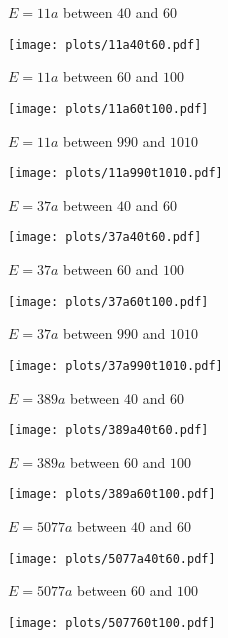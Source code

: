 \documentclass[11pt]{article}
\theoremstyle{plain}
\theoremstyle{definition}
\numberwithin{equation}{section}
\numberwithin{figure}{section}
\numberwithin{table}{section}
\begin{document}
 \centerline{ $E = 11a$  between $40$ and $60$}
   \vskip10pt
 \hskip100pt\texttt{[image: plots/11a40t60.pdf]}
    \newpage
  \centerline{ $E = 11a$  between $60$ and $100$}
   \vskip10pt
 \hskip100pt\texttt{[image: plots/11a60t100.pdf]}

   \vskip10pt
   \centerline{ $E = 11a$  between $990$ and $1010$}
   \vskip10pt
 \hskip100pt\texttt{[image: plots/11a990t1010.pdf]}

 \newpage
   \centerline{ $E = 37a$  between $40$ and $60$}

   \vskip10pt
 \hskip100pt\texttt{[image: plots/37a40t60.pdf]}

   \centerline{ $E = 37a$  between $60$ and $100$}
   \vskip10pt
 \hskip100pt\texttt{[image: plots/37a60t100.pdf]}
 \newpage
  \centerline{ $E = 37a$  between $990$ and $1010$}
   \vskip10pt
 \hskip100pt\texttt{[image: plots/37a990t1010.pdf]}
 \newpage
  \centerline{ $E = 389a$  between $40$ and $60$}
   \vskip10pt
 \hskip100pt\texttt{[image: plots/389a40t60.pdf]}

   \centerline{ $E = 389a$  between $60$ and $100$}
   \vskip10pt
 \hskip100pt\texttt{[image: plots/389a60t100.pdf]}
\newpage
  \centerline{ $E = 5077a$  between $40$ and $60$}
   \vskip10pt
 \hskip100pt\texttt{[image: plots/5077a40t60.pdf]}

   \centerline{ $E = 5077a$  between $60$ and $100$}
   \vskip10pt
 \hskip100pt\texttt{[image: plots/507760t100.pdf]}
\end{document}
